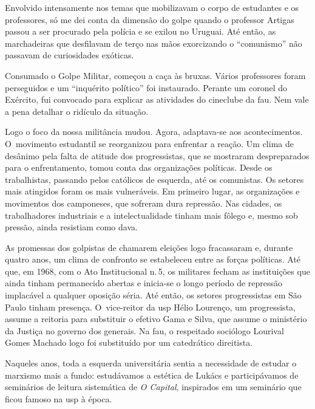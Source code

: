 Envolvido intensamente nos temas que mobilizavam o corpo de estudantes e
os professores, só me dei conta da dimensão do golpe quando o professor
Artigas passou a ser procurado pela polícia e se exilou no Uruguai. Até
então, as marchadeiras que desfilavam de terço nas mãos exorcizando o
“comunismo” não passavam de curiosidades exóticas.

\subject{O golpe}

Consumado o Golpe Militar, começou a caça às bruxas. Vários professores
foram perseguidos e um “inquérito político” foi instaurado. Perante um
coronel do Exército, fui convocado para explicar as atividades do cineclube da {\sc fau}.
Nem vale a pena detalhar o ridículo da situação.

Logo o foco da nossa militância mudou. Agora, adaptava-se aos
acontecimentos. O~movimento estudantil se reorganizou para enfrentar a
reação. Um clima de desânimo pela falta de atitude dos progressistas, que se
mostraram despreparados para o enfrentamento, tomou conta das
organizações políticas. Desde os trabalhistas, passando pelos católicos
de esquerda, até os comunistas. Os setores mais atingidos foram os mais
vulneráveis. Em primeiro lugar, as organizações e movimentos dos
camponeses, que sofreram dura repressão. Nas cidades, os trabalhadores
industriais e a intelectualidade tinham mais fôlego e, mesmo sob pressão,
ainda resistiam como dava.

As promessas dos golpistas de chamarem eleições logo fracassaram e, durante
quatro anos, um clima de confronto se estabeleceu entre as forças políticas.
Até que, em 1968, com o Ato Institucional n.\,5, os militares fecham as
instituições que ainda tinham permanecido abertas e inicia-se o longo
período de repressão implacável a qualquer oposição séria. Até então, os
setores progressistas em São Paulo tinham presença. O~vice-reitor da {\sc usp}
Hélio Lourenço, um progressista, assume a reitoria para substituir o efetivo
Gama e Silva, que assume o ministério da Justiça no governo dos generais.
Na {\sc fau}, o respeitado sociólogo Lourival Gomes Machado logo foi
substituído por um catedrático direitista.

Naqueles anos, toda a esquerda universitária sentia a necessidade de
estudar o marxismo mais a fundo: estudávamos a estética de Lukács e
participávamos de seminários de leitura sistemática de {\it O Capital},
inspirados em um seminário que ficou famoso na {\sc usp} à época.

